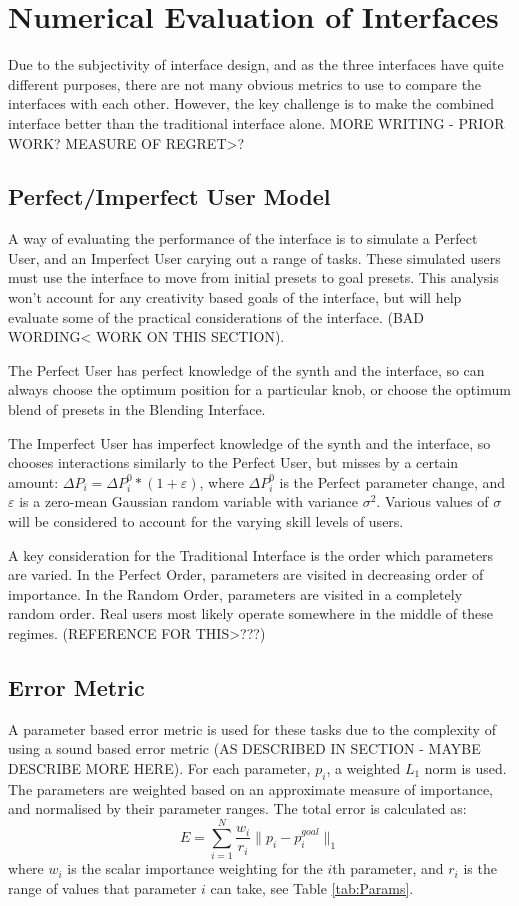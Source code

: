 \documentclass[11pt, oneside]{report}   	%
\begin{document}
\chapter{Numerical Evaluation of Interfaces}
Due to the subjectivity of interface design, and as the three interfaces have quite different purposes, there are not many obvious metrics to use to compare the interfaces with each other. However, the key challenge is to make the combined interface better than the traditional interface alone. MORE WRITING - PRIOR WORK? MEASURE OF REGRET>?
\section{Perfect/Imperfect User Model}
A way of evaluating the performance of the interface is to simulate a Perfect User, and an Imperfect User carying out a range of tasks. These simulated users must use the interface to move from initial presets to goal presets. This analysis won't account for any creativity based goals of the interface, but will help evaluate some of the practical considerations of the interface. (BAD WORDING< WORK ON THIS SECTION).
 
The Perfect User has perfect knowledge of the synth and the interface, so can always choose the optimum position for a particular knob, or choose the optimum blend of presets in the Blending Interface.

The Imperfect User has imperfect knowledge of the synth and the interface, so chooses interactions similarly to the Perfect User, but misses by a certain amount: $\Delta P_i = \Delta P_i^0 * (1 + \varepsilon)$, where $\Delta P_i^0$ is the Perfect parameter change, and $\varepsilon$ is a zero-mean Gaussian random variable with variance $\sigma^2$. Various values of $\sigma$ will be considered to account for the varying skill levels of users.

A key consideration for the Traditional Interface is the order which parameters are varied. In the Perfect Order, parameters are visited in decreasing order of importance. In the Random Order, parameters are visited in a completely random order. Real users most likely operate somewhere in the middle of these regimes. (REFERENCE FOR THIS>???)

\section{Error Metric}
A parameter based error metric is used for these tasks due to the complexity of using a sound based error metric (AS DESCRIBED IN SECTION - MAYBE DESCRIBE MORE HERE). 
For each parameter, $p_i$, a weighted $L_1$ norm is used. The parameters are weighted based on an approximate measure of importance, and normalised by their parameter ranges. The total error is calculated as:
\begin{equation}
E = \sum_{i=1}^{N}\frac{w_i}{r_i} \| p_i - p_i^{goal} \|_1 
\end{equation}
where $w_i$ is the scalar importance weighting for the $i$th parameter, and $r_i$ is the range of values that parameter $i$ can take, see Table \ref{tab:Params}.
\end{document}
